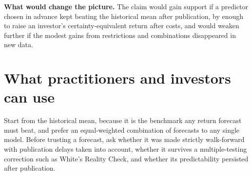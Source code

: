 \textbf{What would change the picture.} The claim would gain support if a predictor chosen in advance kept beating the historical mean after publication, by enough to raise an investor's certainty-equivalent return after costs, and would weaken further if the modest gains from restrictions and combinations disappeared in new data.

\section{What practitioners and investors can use}
\label{sec:09-investors}

Start from the historical mean, because it is the benchmark any return forecast must beat, and prefer an equal-weighted combination of forecasts to any single model. Before trusting a forecast, ask whether it was made strictly walk-forward with publication delays taken into account, whether it survives a multiple-testing correction such as White's Reality Check, and whether its predictability persisted after publication.
